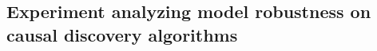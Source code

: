 \documentclass{article}
\begin{document}
    



\subsection{Experiment analyzing model robustness on causal discovery algorithms} \label{Appendix: Experiment analyzing method robustness on causal discovery algorithm}
\end{document}
